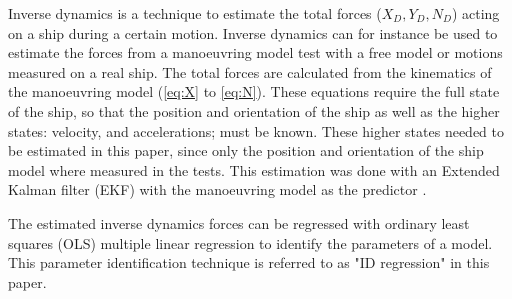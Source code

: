 Inverse dynamics is a technique to estimate the total forces ($X_D,Y_D,N_D$) acting on a ship during a certain motion. Inverse dynamics can for instance be used to estimate the forces from a manoeuvring model test with a free model or motions measured on a real ship. The total forces are calculated from the kinematics of the manoeuvring model (\autoref{eq:X} to \autoref{eq:N}). These equations require the full state of the ship, so that the position and orientation of the ship as well as the higher states: velocity, and accelerations; must be known. 
These higher states needed to be estimated in this paper, since only the position and orientation of the ship model where measured in the tests. This estimation was done with an Extended Kalman filter (EKF) with the manoeuvring model as the predictor \citep{alexandersson_wpcc_2022}.

The estimated inverse dynamics forces can be regressed with ordinary least squares (OLS) multiple
linear regression to identify the parameters of a model. This parameter identification technique is referred to as "ID regression" in this paper.